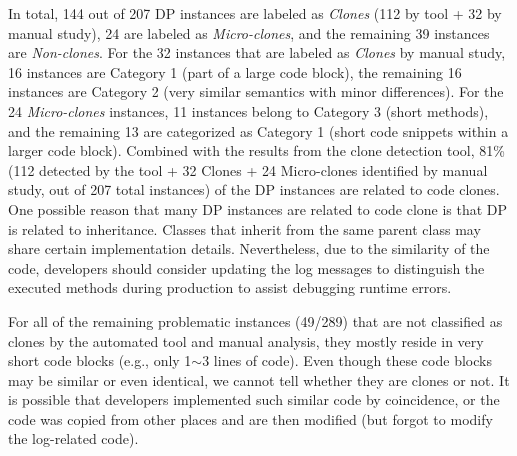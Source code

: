  In total, 144 out of 207 DP instances are labeled as {\em Clones} (112 by tool + 32 by manual study), 24 are labeled as {\em Micro-clones}, and the remaining 39 instances are {\em Non-clones}. For the 32 instances that are labeled as {\em Clones} by manual study, 16 instances are Category 1 (part of a large code block), the remaining 16 instances are Category 2 (very similar semantics with minor differences). For the 24 {\em Micro-clones} instances, 11 instances belong to Category 3 (short methods), and the remaining 13 are categorized as Category 1 (short code snippets within a larger code block).
Combined with the results from the clone detection tool, 81\% (112 detected by the tool + 32 Clones + 24 Micro-clones identified by manual study, out of 207 total instances) of the DP instances are related to code clones.
One possible reason that many DP instances are related to code clone is that DP is related to inheritance. Classes that inherit from the same parent class may share certain implementation details. Nevertheless, due to the similarity of the code, developers should consider updating the log messages to distinguish the executed methods during production to assist debugging runtime errors.

For all of the remaining problematic instances (49/289) that are not classified as clones by the automated tool and manual analysis, they mostly reside in very short code blocks (e.g., only 1$\sim$3 lines of code). Even though these code blocks may be similar or even identical, we cannot tell whether they are clones or not. It is possible that developers implemented such similar code by coincidence, or the code was copied from other places and are then modified (but forgot to modify the log-related code).

